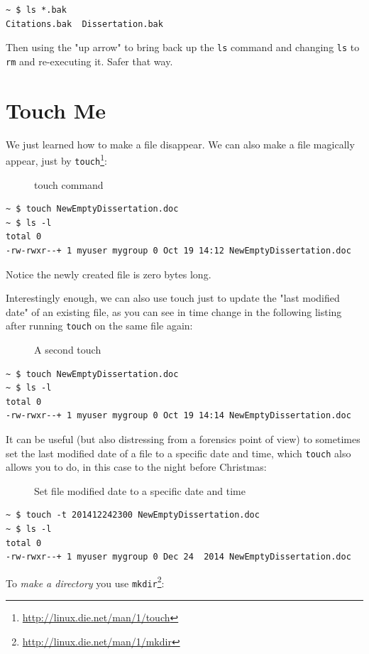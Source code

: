 \documentclass[10pt,]{book}
\renewcommand{\href}[2]{#2\footnote{\url{#1}}}
\numberwithin{figure}{chapter}
\DeclareRobustCommand{\drcap}[1]{\begin{figure}[H]\caption{#1}\end{figure}}
\DeclareRobustCommand{\drcmd}[1]{\index{Commands!#1}}
\begin{document}
\begin{verbatim}
~ $ ls *.bak
Citations.bak  Dissertation.bak
\end{verbatim}

Then using the "up arrow" to bring back up the \texttt{ls} command and
changing \texttt{ls} to \texttt{rm} and re-executing it. Safer that way.

\section*{Touch Me}\label{touch-me}

We just learned how to make a file disappear. We can also make a file
magically appear, just by
\href{http://linux.die.net/man/1/touch}{\texttt{touch}}\drcmd{touch}:

\drcap{touch command}

\begin{verbatim}
~ $ touch NewEmptyDissertation.doc
~ $ ls -l
total 0
-rw-rwxr--+ 1 myuser mygroup 0 Oct 19 14:12 NewEmptyDissertation.doc
\end{verbatim}

Notice the newly created file is zero bytes long.

Interestingly enough, we can also use touch just to update the "last
modified date" of an existing file, as you can see in time change in the
following listing after running \texttt{touch} on the same file again:

\drcap{A second touch}

\begin{verbatim}
~ $ touch NewEmptyDissertation.doc
~ $ ls -l
total 0
-rw-rwxr--+ 1 myuser mygroup 0 Oct 19 14:14 NewEmptyDissertation.doc
\end{verbatim}

It can be useful (but also distressing from a forensics point of view)
to sometimes set the last modified date of a file to a specific date and
time, which \texttt{touch} also allows you to do, in this case to the
night before Christmas:

\drcap{Set file modified date to a specific date and time}

\begin{verbatim}
~ $ touch -t 201412242300 NewEmptyDissertation.doc
~ $ ls -l
total 0
-rw-rwxr--+ 1 myuser mygroup 0 Dec 24  2014 NewEmptyDissertation.doc
\end{verbatim}

To \emph{make a directory} you use
\href{http://linux.die.net/man/1/mkdir}{\texttt{mkdir}}\drcmd{mkdir}:
\end{document}

